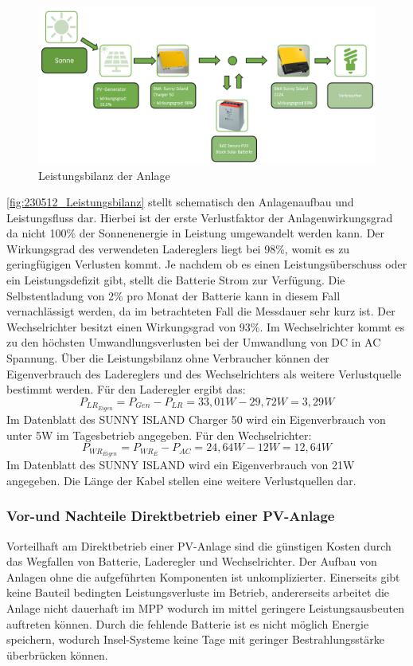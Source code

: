 \begin{figure}[!ht]
		\centering
		\includegraphics[width=\linewidth]{Abbildungen/Leistungsbilanz.png}
		\caption{Leistungsbilanz der Anlage}
		\label{fig:230512_Leistungsbilanz}
\end{figure}

\autoref{fig:230512_Leistungsbilanz} stellt schematisch den Anlagenaufbau und Leistungsfluss dar. Hierbei ist der erste Verlustfaktor der Anlagenwirkungsgrad da nicht 100\% der Sonnenenergie in Leistung umgewandelt werden kann. Der Wirkungsgrad des verwendeten Ladereglers liegt bei 98\%, womit es zu geringfügigen Verlusten kommt. Je nachdem ob es einen Leistungsüberschuss oder ein Leistungsdefizit gibt, stellt die Batterie Strom zur Verfügung. Die Selbstentladung von 2\% pro Monat der Batterie kann in diesem Fall vernachlässigt werden, da im betrachteten Fall die Messdauer sehr kurz ist. Der Wechselrichter besitzt einen Wirkungsgrad von 93\%. Im Wechselrichter kommt es zu den höchsten Umwandlungsverlusten bei der Umwandlung von DC in AC Spannung.
Über die Leistungsbilanz ohne Verbraucher können der Eigenverbrauch des Ladereglers und des Wechselrichters als weitere Verlustquelle bestimmt werden. 
Für den Laderegler ergibt das:
$$ P_{LR_{Eigen}}= P_{Gen} - P_{LR} = 33,01W -29,72W =3,29W$$
Im Datenblatt des SUNNY ISLAND Charger 50 wird ein Eigenverbrauch von unter 5W im Tagesbetrieb angegeben.
Für den Wechselrichter:
$$P_{WR_{Eigen}}= P_{WR_E}-P_{AC} = 24,64W -12W = 12,64W$$
Im Datenblatt des SUNNY ISLAND wird ein Eigenverbrauch von 21W angegeben.
Die Länge der Kabel stellen eine weitere Verlustquellen dar.


\subsubsection{Vor-und Nachteile Direktbetrieb einer PV-Anlage}
Vorteilhaft am Direktbetrieb einer PV-Anlage sind die günstigen Kosten durch das Wegfallen von Batterie, Laderegler und Wechselrichter. Der Aufbau von Anlagen ohne die aufgeführten Komponenten ist unkomplizierter. Einerseits gibt keine Bauteil bedingten Leistungsverluste  im Betrieb, andererseits arbeitet die Anlage nicht dauerhaft im MPP wodurch im mittel geringere Leistungsausbeuten auftreten können.  
Durch die fehlende Batterie ist es nicht möglich Energie speichern, wodurch Insel-Systeme keine Tage mit geringer Bestrahlungsstärke überbrücken können. 

